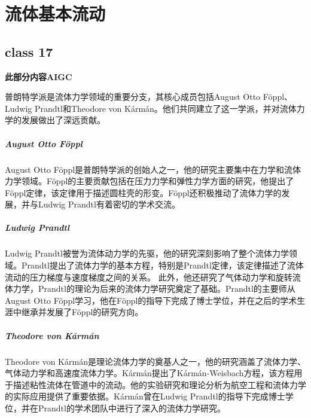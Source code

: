 \ifx\allfiles\undefined


\else
\fi
\chapter{流体基本流动}
\section{class 17}
\begin{add}
    \textbf{此部分内容AIGC}

    普朗特学派是流体力学领域的重要分支，其核心成员包括August Otto Föppl、Ludwig Prandtl和Theodore von Kármán。他们共同建立了这一学派，并对流体力学的发展做出了深远贡献。
    
    \paragraph{August Otto Föppl}
    
    August Otto Föppl是普朗特学派的创始人之一，他的研究主要集中在力学和流体力学领域。Föppl的主要贡献包括在压力力学和弹性力学方面的研究，他提出了Föppl定律，该定律用于描述圆柱壳的形变。Föppl还积极推动了流体力学的发展，并与Ludwig Prandtl有着密切的学术交流。
    
    \paragraph{Ludwig Prandtl}
    
    Ludwig Prandtl被誉为流体动力学的先驱，他的研究深刻影响了整个流体力学领域。Prandtl提出了流体力学的基本方程，特别是Prandtl定律，该定律描述了流体流动的压力梯度与速度梯度之间的关系。
    此外，他还研究了气体动力学和旋转流体力学，Prandtl的理论为后来的流体力学研究奠定了基础。Prandtl的主要师从August Otto Föppl学习，他在Föppl的指导下完成了博士学位，并在之后的学术生涯中继承并发展了Föppl的研究方向。
    
    \paragraph{Theodore von Kármán}
    
    Theodore von Kármán是理论流体力学的奠基人之一，他的研究涵盖了流体力学、气体动力学和高速度流体力学。Kármán提出了Kármán-Weisbach方程，该方程用于描述粘性流体在管道中的流动。他的实验研究和理论分析为航空工程和流体力学的实际应用提供了重要依据。Kármán曾在Ludwig Prandtl的指导下完成博士学位，并在Prandtl的学术团队中进行了深入的流体力学研究。
    

\end{add}
